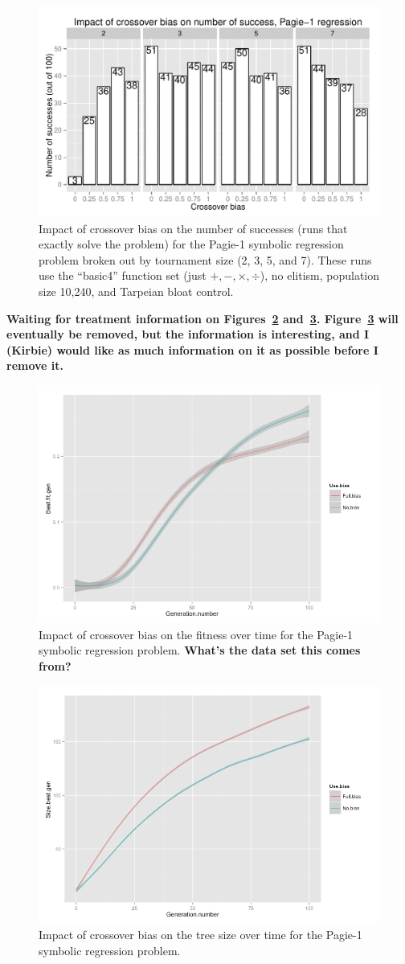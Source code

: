 \documentclass{sig-alternate}
\begin{document}
\begin{figure}
\centering
\includegraphics[width=0.45 \textwidth]{Plots/Pagie_1_Strong_Successes_vs_Bias.pdf}
\caption{Impact of crossover bias on the number of successes (runs that exactly solve the problem) for the Pagie-1
symbolic regression problem broken out by tournament size (2, 3, 5, and 7). These runs use the ``basic4'' function set
(just $+, -, \times, \div$), no elitism, population size 10,240, and Tarpeian bloat control.}
\label{fig:Pagie1StrongSuccesses}
\end{figure}

\textbf{Waiting for treatment information on Figures~\ref{fig:Pagie1FitnessOverTime} and~\ref{fig:Pagie1SizeOverTime}.
Figure~\ref{fig:Pagie1SizeOverTime} will eventually be removed, but the information is interesting, and I (Kirbie)
would like as much information on it as possible before I remove it.}

\begin{figure}
\centering
\includegraphics[width=0.45 \textwidth]{Plots/Pagie-1_fitness_vs_time.png}
\caption{Impact of crossover bias on the fitness over time for the Pagie-1 symbolic regression problem. \textbf{What's the data set this comes from?}}
\label{fig:Pagie1FitnessOverTime}
\end{figure}

\begin{figure}
\centering
\includegraphics[width=0.45 \textwidth]{Plots/Pagie-1_size_vs_time.png}
\caption{Impact of crossover bias on the tree size over time for the Pagie-1 symbolic regression problem.}
\label{fig:Pagie1SizeOverTime}
\end{figure}
\end{document}
